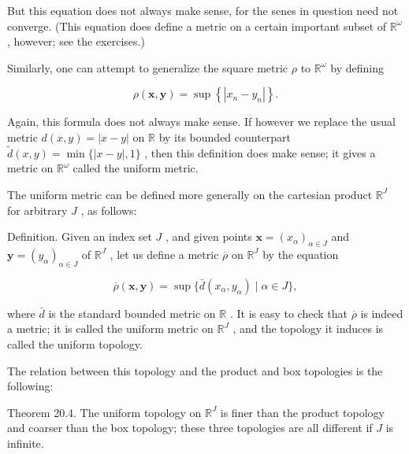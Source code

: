 \documentclass[10pt]{article}
\begin{document}
But this equation does not always make sense, for the senes in question need not converge. (This equation does define a metric on a certain important subset of \({\mathbb{R}}^{\omega }\) , however; see the exercises.)

Similarly, one can attempt to generalize the square metric \(\rho\) to \({\mathbb{R}}^{\omega }\) by defining

\[
\rho \left( {\mathbf{x},\mathbf{y}}\right)  = \sup \left\{  \left| {{x}_{n} - {y}_{n}}\right| \right\}  .
\]

Again, this formula does not always make sense. If however we replace the usual metric \(d\left( {x,y}\right)  = \left| {x - y}\right|\) on \(\mathbb{R}\) by its bounded counterpart \(\widetilde{d}\left( {x,y}\right)  = \min \{ \left| {x - y}\right| ,1\}\) , then this definition does make sense; it gives a metric on \({\mathbb{R}}^{\omega }\) called the uniform metric.

The uniform metric can be defined more generally on the cartesian product \({\mathbb{R}}^{J}\) for arbitrary \(J\) , as follows:

Definition. Given an index set \(J\) , and given points \(\mathbf{x} = {\left( {x}_{\alpha }\right) }_{\alpha  \in  J}\) and \(\mathbf{y} = {\left( {y}_{\alpha }\right) }_{\alpha  \in  J}\) of \({\mathbb{R}}^{J}\) , let us define a metric \(\overline{\rho }\) on \({\mathbb{R}}^{J}\) by the equation

\[
\overline{\rho }\left( {\mathbf{x},\mathbf{y}}\right)  = \sup \{ \bar{d}\left( {{x}_{\alpha },{y}_{\alpha }}\right)  \mid  \alpha  \in  J\} ,
\]

where \(\bar{d}\) is the standard bounded metric on \(\mathbb{R}\) . It is easy to check that \(\overline{\rho }\) is indeed a metric; it is called the uniform metric on \({\mathbb{R}}^{J}\) , and the topology it induces is called the uniform topology.

The relation between this topology and the product and box topologies is the following:

Theorem 20.4. The uniform topology on \({\mathbb{R}}^{J}\) is finer than the product topology and coarser than the box topology; these three topologies are all different if \(J\) is infinite.
\end{document}
